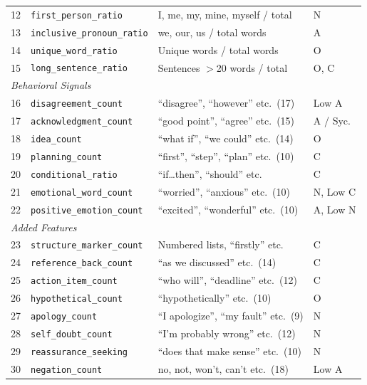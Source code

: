 \documentclass[12pt, a4paper]{report}
\begin{document}
\begin{table}[t]
\begin{tabular}{r l p{4.5cm} l}
12 & \texttt{first\_person\_ratio}     & I, me, my, mine, myself / total & N \\
13 & \texttt{inclusive\_pronoun\_ratio} & we, our, us / total words & A \\
14 & \texttt{unique\_word\_ratio}      & Unique words / total words & O \\
15 & \texttt{long\_sentence\_ratio}    & Sentences $>$20 words / total & O, C \\
\midrule
\multicolumn{4}{l}{\textit{Behavioral Signals}} \\
16 & \texttt{disagreement\_count}      & ``disagree'', ``however'' etc.\ (17) & Low A \\
17 & \texttt{acknowledgment\_count}    & ``good point'', ``agree'' etc.\ (15) & A / Syc. \\
18 & \texttt{idea\_count}              & ``what if'', ``we could'' etc.\ (14) & O \\
19 & \texttt{planning\_count}          & ``first'', ``step'', ``plan'' etc.\ (10) & C \\
20 & \texttt{conditional\_ratio}       & ``if\ldots then'', ``should'' etc. & C \\
21 & \texttt{emotional\_word\_count}   & ``worried'', ``anxious'' etc.\ (10) & N, Low C \\
22 & \texttt{positive\_emotion\_count} & ``excited'', ``wonderful'' etc.\ (10) & A, Low N \\
\midrule
\multicolumn{4}{l}{\textit{Added Features}} \\
23 & \texttt{structure\_marker\_count} & Numbered lists, ``firstly'' etc. & C \\
24 & \texttt{reference\_back\_count}   & ``as we discussed'' etc.\ (14) & C \\
25 & \texttt{action\_item\_count}      & ``who will'', ``deadline'' etc.\ (12) & C \\
26 & \texttt{hypothetical\_count}      & ``hypothetically'' etc.\ (10) & O \\
27 & \texttt{apology\_count}           & ``I apologize'', ``my fault'' etc.\ (9) & N \\
28 & \texttt{self\_doubt\_count}       & ``I'm probably wrong'' etc.\ (12) & N \\
29 & \texttt{reassurance\_seeking}     & ``does that make sense'' etc.\ (10) & N \\
30 & \texttt{negation\_count}          & no, not, won't, can't etc.\ (18) & Low A \\
\bottomrule
\end{tabular}
\end{table}
\end{document}
